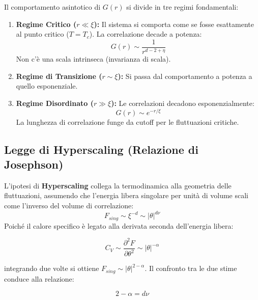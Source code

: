 \noindent Il comportamento asintotico di $G(r)$ si divide in tre regimi fondamentali:
\begin{enumerate}
    \item \textbf{Regime Critico ($r \ll \xi$):}  Il sistema si comporta come se fosse esattamente al punto critico ($T=T_c$). La correlazione decade a potenza:
    \begin{equation}
        G(r) \sim \frac{1}{r^{d-2+\eta}}
    \end{equation}
    Non c'è una scala intrinseca (invarianza di scala).
    
    \item \textbf{Regime di Transizione ($r \sim \xi$):} Si passa dal comportamento a potenza a quello esponenziale.
    
    \item \textbf{Regime Disordinato ($r \gg \xi$):} Le correlazioni decadono esponenzialmente:
    \begin{equation}
        G(r) \sim e^{-r/\xi}
    \end{equation}
    La lunghezza di correlazione funge da cutoff per le fluttuazioni critiche.
\end{enumerate}

\subsection{Legge di Hyperscaling (Relazione di Josephson)}
L'ipotesi di \textbf{Hyperscaling} collega la termodinamica alla geometria delle fluttuazioni, assumendo che l'energia libera singolare per unità di volume scali come l'inverso del volume di correlazione:
\begin{equation}
    F_{sing} \sim \xi^{-d} \sim |\theta|^{d\nu}
\end{equation}
Poiché il calore specifico è legato alla derivata seconda dell'energia libera:

\begin{equation}
   C_V \sim \frac{\partial^2 F }{ \partial \theta^2 } \sim |\theta|^{-\alpha}
\end{equation}

integrando due volte si ottiene $F_{sing} \sim |\theta|^{2-\alpha}$. Il confronto tra le due stime conduce alla relazione:

\begin{tcolorbox}[colback=yellow!25, colframe=yellow!75!orange, coltitle=black, title=\textbf{Relazione di Josephson}]
\begin{equation}
    2 - \alpha = d \nu
    \label{eq:hyperscaling}
\end{equation}
\end{tcolorbox}

